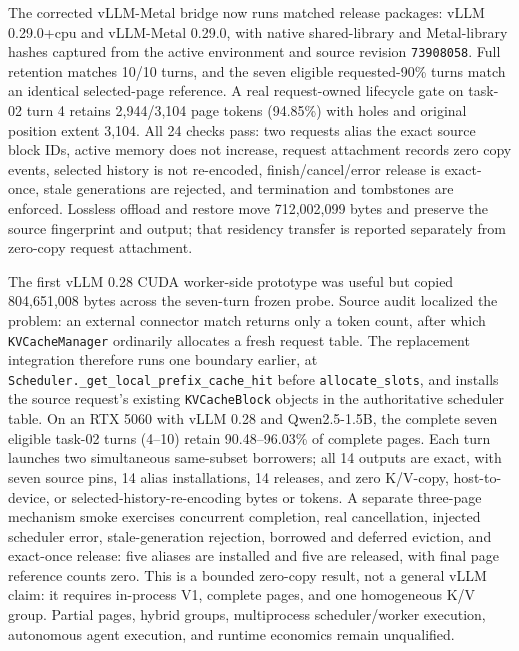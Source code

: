 \documentclass[11pt]{article}
\begin{document}
The corrected vLLM-Metal bridge now runs matched release packages: vLLM
0.29.0+cpu and vLLM-Metal 0.29.0, with native shared-library and Metal-library
hashes captured from the active environment and source revision
\texttt{73908058}.  Full retention matches 10/10 turns, and the seven eligible
requested-90\% turns match an identical selected-page reference.  A real
request-owned lifecycle gate on task-02 turn 4 retains 2,944/3,104 page tokens
(94.85\%) with holes and original position extent 3,104.  All 24 checks pass:
two requests alias the exact source block IDs, active memory does not increase,
request attachment records zero copy events, selected history is not
re-encoded, finish/cancel/error release is exact-once, stale generations are
rejected, and termination and tombstones are enforced.  Lossless offload and
restore move 712,002,099 bytes and preserve the source fingerprint and output;
that residency transfer is reported separately from zero-copy request
attachment.

The first vLLM 0.28 CUDA worker-side prototype was useful but copied
804,651,008 bytes across the seven-turn frozen probe.  Source audit localized
the problem: an external connector match returns only a token count, after
which \texttt{KVCacheManager} ordinarily allocates a fresh request table.  The
replacement integration therefore runs one boundary earlier, at
\texttt{Scheduler.\_get\_local\_prefix\_cache\_hit} before
\texttt{allocate\_slots}, and installs the source request's existing
\texttt{KVCacheBlock} objects in the authoritative scheduler table.  On an RTX
5060 with vLLM 0.28 and Qwen2.5-1.5B, the complete seven eligible task-02
turns (4--10) retain 90.48--96.03\% of complete pages.  Each turn launches two
simultaneous same-subset borrowers; all 14 outputs are exact, with seven source
pins, 14 alias installations, 14 releases, and zero K/V-copy, host-to-device,
or selected-history-re-encoding bytes or tokens.  A separate three-page
mechanism smoke exercises concurrent completion, real cancellation, injected
scheduler error, stale-generation rejection, borrowed and deferred eviction,
and exact-once release: five aliases are installed and five are released, with
final page reference counts zero.  This is a bounded zero-copy result, not a
general vLLM claim: it requires in-process V1, complete pages, and one
homogeneous K/V group.  Partial pages, hybrid groups, multiprocess
scheduler/worker execution, autonomous agent execution, and runtime economics
remain unqualified.
\end{document}
